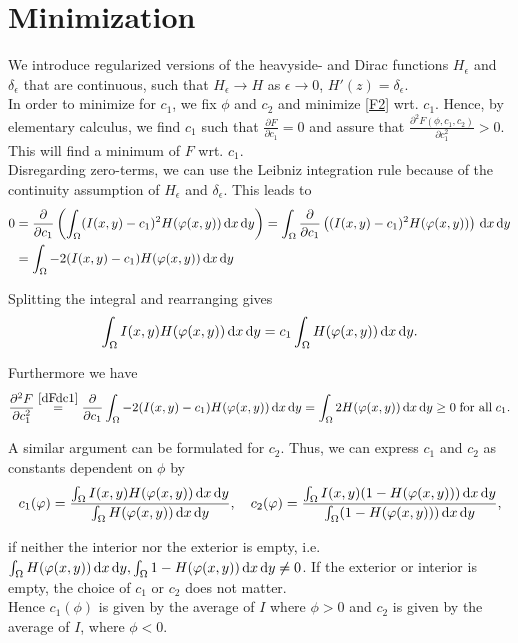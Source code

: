 \section{Minimization}
We introduce regularized versions of the heavyside- and Dirac functions $H_\epsilon$ and $\delta_\epsilon$ that are continuous, such that $H_\epsilon\to H$ as $\epsilon\to 0$, $H'(z) = \delta_\epsilon$.\\
In order to minimize for $c_1$, we fix $\phi$ and $c_2$ and minimize \eqref{F2} wrt. $c_1$. Hence, by elementary calculus, we find $c_1$ such that $\frac{\partial F}{\partial c_1}=0$ and assure that $\frac{\partial^2 F(\phi,c_1,c_2)}{\partial c_1^2} > 0$. This will find a minimum of $F$ wrt. $c_1$.\\
Disregarding zero-terms, we can use the Leibniz integration rule because of the continuity assumption of $H_\epsilon$ and $\delta_\epsilon$. This leads to
\begin{align}
  0 &= \frac{\partial}{\partial c_1} \left(\int_\Omega (I(x,y)-c_1)^2H(\phi(x,y))\df x \df y\right)=\int_\Omega \frac{\partial}{\partial c_1} \left((I(x,y)-c_1)^2H(\phi(x,y))\right)\df x \df y\\
    &= \int_\Omega -2(I(x,y)-c_1)H(\phi(x,y))\df x \df y\label{dFdc1}
\end{align}

Splitting the integral and rearranging gives
\begin{align*} 
  \int_\Omega I(x,y)H(\varphi(x,y))\,{\rm d} x\,{\rm d} y = c_1\int_\Omega H(\varphi(x,y))\,{\rm d} x \,{\rm d} y.
\end{align*}

Furthermore we have 
\begin{equation}
\frac{\partial^2 F}{\partial c_1^2} \stackrel{\eqref{dFdc1}}{=} \frac{\partial}{\partial c_1} \int_\Omega -2(I(x,y)-c_1)H(\varphi(x,y))\,{\rm d} x \,{\rm d} y = \int_\Omega 2H(\varphi(x,y))\,{\rm d} x \,{\rm d} y \geq 0\; \text{for all} \; c_1.
\end{equation}

A similar argument can be formulated for $c_2$. Thus, we can express $c_1$ and $c_2$ as constants dependent on $\phi$ by
\begin{equation}
  c_1(\varphi) = \frac{\int_\Omega I(x,y) H(\varphi(x,y)) \,{\rm d} x \,{\rm d} y}{\int_\Omega H(\varphi(x,y)) \,{\rm d} x \,{\rm d} y}, \quad 
  c_2(\varphi) = \frac{\int_\Omega I(x,y) (1-H(\varphi(x,y))) \,{\rm d} x \,{\rm d} y}{\int_\Omega (1-H(\varphi(x,y))) \,{\rm d} x \,{\rm d} y},
\end{equation}

if neither the interior nor the exterior is empty, i.e. $\int_\Omega H(\varphi(x,y))\,{\rm d} x \,{\rm d} y, \int_\Omega 1-H(\varphi(x,y))\,{\rm d} x \,{\rm d} y\neq 0$. If the exterior or interior is empty, the choice of $c_1$ or $c_2$ does not matter. \\
Hence $c_1(\phi)$ is given by the average of $I$ where $\phi >0$ and $c_2$ is given by the average of $I$, where $\phi<0$.\\

